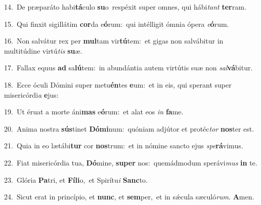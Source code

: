 {\numbfont\textcolor{\numbcolor}{14.}}~De præparáto habi\-\textbf{tá}\-culo \textbf{su}\-o~\star respéxit super omnes, qui hábi\textit{tant} \textbf{ter}\-ram.\par
{\numbfont\textcolor{\numbcolor}{15.}}~Qui finxit sigillátim \textbf{cor}\-da e\-\textbf{ó}\-rum:~\star qui intélligit ómnia ópera \textit{e}\-\textbf{ó}rum.\par
{\numbfont\textcolor{\numbcolor}{16.}}~Non salvátur rex per \textbf{mul}\-tam vir\-\textbf{tú}\-tem:~\star et gigas non salvábitur in multitúdine virtú\textit{tis} \textbf{su}\-æ.\par
{\numbfont\textcolor{\numbcolor}{17.}}~Fallax equus \textbf{ad} sa\-\textbf{lú}\-tem:~\star in abundántia autem virtútis suæ non \textit{sal}\-\textbf{vá}bitur.\par
{\numbfont\textcolor{\numbcolor}{18.}}~Ecce óculi Dómini super metu\-\textbf{én}\-tes \textbf{e}\-um:~\star et in eis, qui sperant super misericórdi\textit{a} \textbf{e}\-jus:\par
{\numbfont\textcolor{\numbcolor}{19.}}~Ut éruat a morte áni\textbf{mas} e\-\textbf{ó}\-rum:~\star et alat eos \textit{in} \textbf{fa}\-me.\par
{\numbfont\textcolor{\numbcolor}{20.}}~Anima nostra \textbf{sús}\-tinet \textbf{Dó}\-\textbf{mi}num:~\star quóniam adjútor et protéc\textit{tor} \textbf{nos}\-ter est.\par
{\numbfont\textcolor{\numbcolor}{21.}}~Quia in eo lætábi\textbf{tur} cor \textbf{nos}\-trum:~\star et in nómine sancto ejus \textit{spe}\-\textbf{rá}vimus.\par
{\numbfont\textcolor{\numbcolor}{22.}}~Fiat misericórdia tua, \textbf{Dó}\-mine, \textbf{su}\-\textbf{per} nos:~\star quemádmodum sperávi\textit{mus} \textbf{in} te.\par
{\numbfont\textcolor{\numbcolor}{23.}}~Glória \textbf{Pa}\-tri, et \textbf{Fí}\-\textbf{li}o,~\star et Spirítu\textit{i} \textbf{Sanc}\-to.\par
{\numbfont\textcolor{\numbcolor}{24.}}~Sicut erat in princípio, et \textbf{nunc}\-, et \textbf{sem}\-per,~\star et in sǽcula sæculó\-\textit{rum}\-. \textbf{A}\-men.\par
